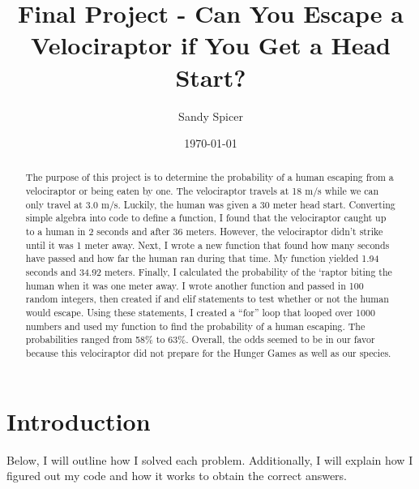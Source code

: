 \documentclass[twocolumn]{revtex4}
\begin{document}



\title{
Final Project - Can You Escape a Velociraptor if You Get a Head Start?
}

\author{Sandy Spicer}

\date{\today}

\begin{abstract}
    
The purpose of this project is to determine the probability of a human escaping from a velociraptor or being eaten by one. The velociraptor travels at 18 m/s while we can only travel at 3.0 m/s. Luckily, the human was given a 30 meter head start. Converting simple algebra into code to define a function, I found that the velociraptor caught up to a human in 2 seconds and after 36 meters. However, the velociraptor didn't strike until it was 1 meter away. Next, I wrote a new function that found how many seconds have passed and how far the human ran during that time. My function yielded 1.94 seconds and 34.92 meters. Finally, I calculated the probability of the `raptor biting the human when it was one meter away. I wrote another function and passed in 100 random integers, then created if and elif statements to test whether or not the human would escape. Using these statements, I created a ``for'' loop that looped over 1000 numbers and used my function to find the probability of a human escaping. The probabilities ranged from 58\% to 63\%. Overall, the odds seemed to be in our favor because this velociraptor did not prepare for the Hunger Games as well as our species. 

\end{abstract}



\maketitle

\section{Introduction}
Below, I will outline how I solved each problem. Additionally, I will explain how I figured out my code and how it works to obtain the correct answers.
\end{document}

